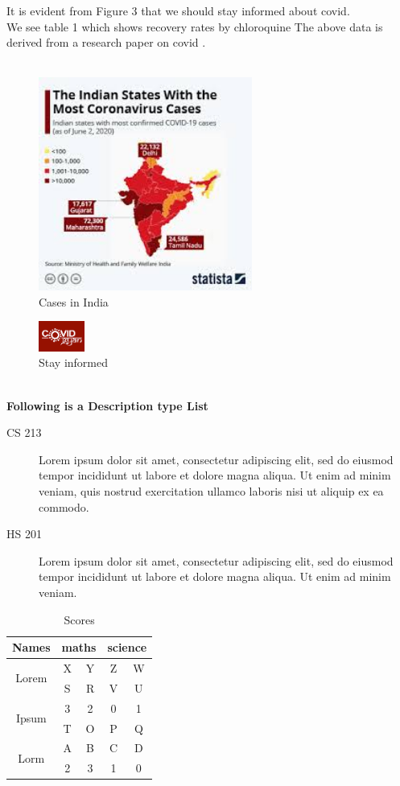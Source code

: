 \documentclass{article}
\begin{document}
It is evident from Figure 3 that we should stay informed about covid.\\
We see table 1 which shows recovery rates by chloroquine
The above data is derived from a research paper on covid \cite{huang2020treating}.
\\
\\
\begin{figure}[h]
    \centering
    \includegraphics[width=7cm]{c19.jpg}
    \caption{Cases in India}
    \label{fig:enter-label}
\end{figure}
\begin{figure}[h]
    \centering
    \includegraphics[width = 1.5cm]{cov.png}
    \caption{Stay informed}
    \label{fig:enter-label}
\end{figure}
\\
\textbf{Following is a Description type List}
\begin{description}
  \item[CS 213] Lorem ipsum dolor sit amet, consectetur adipiscing elit, sed do eiusmod tempor incididunt ut labore et dolore magna aliqua. Ut enim ad minim veniam, quis nostrud exercitation ullamco laboris nisi ut aliquip ex ea commodo.

  \item[HS 201] Lorem ipsum dolor sit amet, consectetur adipiscing elit, sed do eiusmod tempor incididunt ut labore et dolore magna aliqua. Ut enim ad minim veniam.
\end{description}

\newpage
\pagecolor{green}
\begin{table}[ht]
\centering
\begin{tabular}{|c|c|c|c|c|}
    \hline
    Names & \multicolumn{2}{c|}{maths} & \multicolumn{2}{c|}{science} \\ 
    \hline
    \multirow{2}{*}{Lorem} & X & Y & Z & W \\ \cline{2-5}
    & S & R & V & U	 \\ 
    \hline
    \multirow{2}{*}{Ipsum} & 3 & 2 & 0 & 1 \\ \cline{2-5}
    & T & O & P & Q \\
    \hline
    \multirow{2}{*}{Lorm} & A & B & C & D \\ \cline{2-5}
    & 2 & 3 & 1 & 0 \\
    \hline
\end{tabular}
\caption{Scores}
\end{table}
\end{document}
